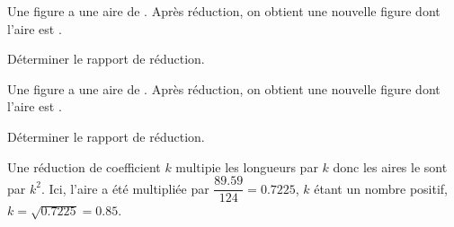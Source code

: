 \begin{exercice*}
    Une figure a une aire de . Après réduction, on obtient une nouvelle figure dont l'aire est .
    
    Déterminer le rapport de réduction.
\end{exercice*}
\begin{corrige}
    Une figure a une aire de . Après réduction, on obtient une nouvelle figure dont l'aire est .
    
    Déterminer le rapport de réduction.

    {\color{red}Une réduction de coefficient $k$ multipie les longueurs par $k$ donc les aires le sont par $k^2$.
    Ici, l'aire a été multipliée par $\dfrac{\num{89.59}}{124}=\num{0.7225}$, $k$ étant un nombre positif, $k=\sqrt{\num{0.7225}}=\num{0.85}$.
    }
\end{corrige}
